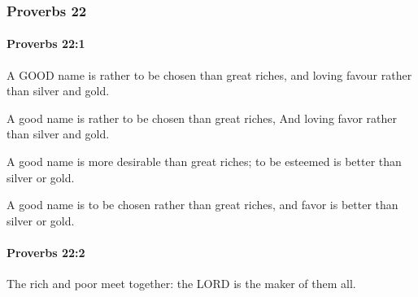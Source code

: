 	\subsubsection{Proverbs 22} %
		\label{PROVERBS-22}

		\paragraph{Proverbs 22:1} %
			\label{PROVERBS-22-1}

			A GOOD name is rather to be chosen than great riches, and loving favour rather than silver and gold.

			\begin{versebox}
					\item[BHS] 
					\item[ASV] A good name is rather to be chosen than great riches, And loving favor rather than silver and gold.
					\item[NIV] A good name is more desirable than great riches; to be esteemed is better than silver or gold.
					\item[NRSV] A good name is to be chosen rather than great riches, and favor is better than silver or gold.
			\end{versebox}

		\paragraph{Proverbs 22:2} %
			\label{PROVERBS-22-2}

			The rich and poor meet together: the LORD is the maker of them all.

